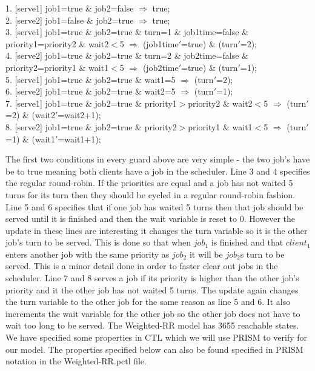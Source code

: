 \documentclass[12pt]{report}
\begin{document}
\begin{center}
1. {[serve1]} job1=true \& job2=false $\Rightarrow$ true;\\
2. {[serve2]} job1=false \& job2=true $\Rightarrow$ true;\\
3. {[serve1]} job1=true \& job2=true \& turn=1 \& job1time=false \& priority1=priority2 \& wait2$<$5 $\Rightarrow$ (job1time$'$=true) \& (turn$'$=2);\\
4. {[serve2]} job1=true \& job2=true \& turn=2 \& job2time=false \& priority2=priority1 \& wait1$<$5 $\Rightarrow$ (job2time$'$=true) \& (turn$'$=1);\\
5. {[serve1]} job1=true \& job2=true \& wait1=5 $\Rightarrow$ (turn$'$=2);\\
6. {[serve2]} job1=true \& job2=true \& wait2=5 $\Rightarrow$ (turn$'$=1);\\
7. {[serve1]} job1=true \& job2=true \& priority1$>$priority2 \& wait2$<$5 $\Rightarrow$ (turn$'$=2) \& (wait2$'$=wait2+1);\\
8. {[serve2]} job1=true \& job2=true \& priority2$>$priority1 \& wait1$<$5 $\Rightarrow$ (turn$'$=1) \& (wait1$'$=wait1+1);
\end{center}
The first two conditions in every guard above are very simple - the two job's have be to true meaning both clients have a job in the scheduler. Line 3 and 4 specifies the regular round-robin. If the priorities are equal and a job has not waited 5 turns for its turn then they should be cycled in a regular round-robin fashion. Line 5 and 6 specifies that if one job has waited 5 turns then that job should be served until it is finished and then the wait variable is reset to 0. However the update in these lines are interesting it changes the turn variable so it is the other job's turn to be served. This is done so that when $job_1$ is finished and that $client_1$ enters another job with the same priority as $job_2$ it will be $job_2$s turn to be served. This is a minor detail done in order to faster clear out jobs in the scheduler. Line 7 and 8 serves a job if its priority is higher than the other job's priority and it the other job has not waited 5 turns. The update again changes the turn variable to the other job for the same reason as line 5 and 6. It also increments the wait variable for the other job so the other job does not have to wait too long to be served. The Weighted-RR model has 3655 reachable states.\\
We have specified some properties in CTL which we will use PRISM to verify for our model. The properties specified below can also be found specified in PRISM notation in the Weighted-RR.pctl file.\\
\end{document}
